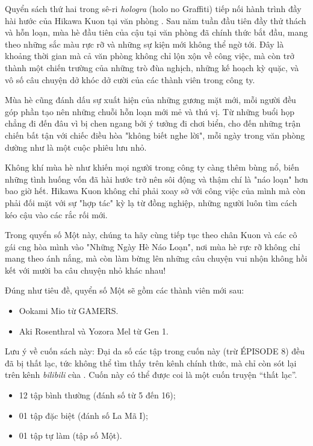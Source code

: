 \documentclass[main.tex]{subfiles}
\begin{document}
Quyển sách thứ hai trong sê-ri \textit{hologra} (holo no Graffiti) tiếp nối hành trình đầy hài hước của Hikawa Kuon tại văn phòng \hll. Sau năm tuần đầu tiên đầy thử thách và hỗn loạn, mùa hè đầu tiên của cậu tại văn phòng đã chính thức bắt đầu, mang theo những sắc màu rực rỡ và những sự kiện mới không thể ngờ tới. Đây là khoảng thời gian mà cả văn phòng không chỉ lộn xộn về công việc, mà còn trở thành một chiến trường của những trò đùa nghịch, những kế hoạch kỳ quặc, và vô số câu chuyện dở khóc dở cười của các thành viên trong công ty.

Mùa hè cũng đánh dấu sự xuất hiện của những gương mặt mới, mỗi người đều góp phần tạo nên những chuỗi hỗn loạn mới mẻ và thú vị. Từ những buổi họp chẳng đi đến đâu vì bị chen ngang bởi ý tưởng đi chơi biển, cho đến những trận chiến bất tận với chiếc điều hòa "không biết nghe lời", mỗi ngày trong văn phòng dường như là một cuộc phiêu lưu nhỏ.

Không khí mùa hè như khiến mọi người trong công ty càng thêm bùng nổ, biến những tình huống vốn đã hài hước trở nên sôi động và thậm chí là "náo loạn" hơn bao giờ hết. Hikawa Kuon không chỉ phải xoay sở với công việc của mình mà còn phải đối mặt với sự "hợp tác" kỳ lạ từ đồng nghiệp, những người luôn tìm cách kéo cậu vào các rắc rối mới.

Trong quyển số Một này, chúng ta hãy cùng tiếp tục theo chân Kuon và các cô gái cng hòa mình vào "Những Ngày Hè Náo Loạn", nơi mùa hè rực rỡ không chỉ mang theo ánh nắng, mà còn làm bừng lên những câu chuyện vui nhộn không hồi kết với mười ba câu chuyện nhỏ khác nhau!

Đúng như tiêu đề, quyển số Một sẽ gồm các thành viên mới sau:
\begin{itemize}
    \item Ookami Mio từ GAMERS.
    \item Aki Rosenthral và Yozora Mel từ Gen 1.
\end{itemize}

Lưu ý về cuốn sách này: Đại da số các tập trong cuốn này (trừ {\flaregothic ÉPISODE 8}) đều đã bị thất lạc, tức không thể tìm thấy trên kênh chính thức, mà chỉ còn sót lại trên kênh \textit{bilibili} cùa \hll. Cuốn này có thể được coi là một cuốn truyện ``thất lạc''.

{}
\begin{itemize}
    \item 12 tập bình thường (đánh số từ 5 đến 16);
    \item 01 tập đặc biệt (đánh số La Mã I);
    \item 01 tập tự làm (tập số Một).
\end{itemize}
\end{document}
